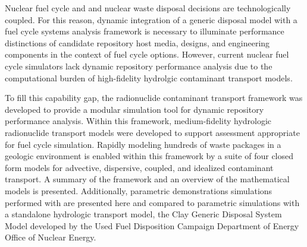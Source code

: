 

Nuclear fuel cycle and and nuclear waste disposal decisions are
technologically coupled. For this reason, dynamic
integration of a generic disposal model with a fuel cycle systems analysis
framework is necessary to illuminate performance distinctions of candidate
repository host media, designs, and engineering components in the context of
fuel cycle options. However, current nuclear fuel cycle simulators lack dynamic
repository performance analysis due to the computational burden of
high-fidelity hydrolgic contaminant transport models.

To fill this capability gap, the \Cyder radionuclide contaminant transport
framework was developed to provide a modular simulation tool for dynamic
repository performance
analysis.  Within this framework, medium-fidelity hydrologic radionuclide
transport models were developed to support assessment appropriate for fuel
cycle simulation. Rapidly modeling hundreds of waste packages in a geologic
environment is enabled within this framework by a suite of four closed form
models for advective, dispersive, coupled, and idealized contaminant transport.
A summary of the framework and an overview of the mathematical models is
presented. Additionally, parametric demonstrations simulations performed with
\Cyder are presented here and compared to parametric simulations with a 
standalone hydrologic transport model, the Clay Generic Disposal System Model
developed by the Used Fuel Disposition Campaign Department of Energy Office of
Nuclear Energy.
